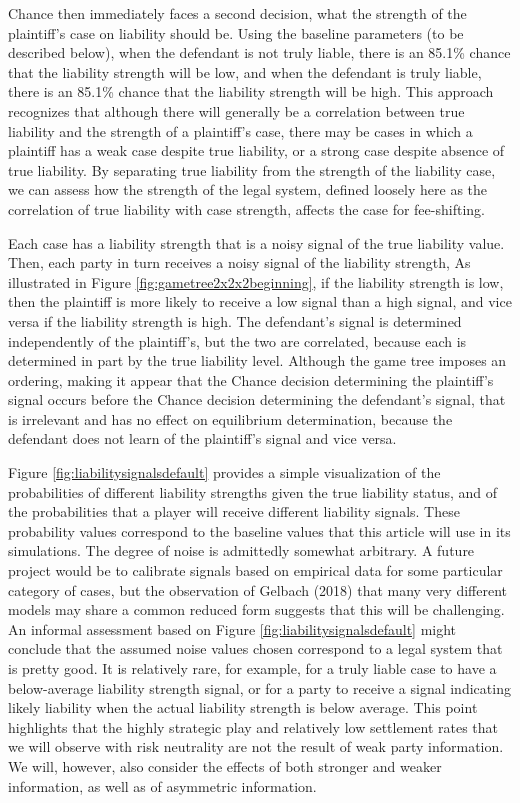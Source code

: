 \documentclass{article}
\begin{document}
Chance then immediately faces a second decision, what the strength of the plaintiff's case on liability should be. Using the baseline parameters (to be described below), when the defendant is not truly liable, there is an 85.1\% chance that the liability strength will be low, and when the defendant is truly liable, there is an 85.1\% chance that the liability strength will be high. This approach recognizes that although there will generally be a correlation between true liability and the strength of a plaintiff's case, there may be cases in which a plaintiff has a weak case despite true liability, or a strong case despite absence of true liability. By separating true liability from the strength of the liability case, we can assess how the strength of the legal system, defined loosely here as the correlation of true liability with case strength, affects the case for fee-shifting. 

Each case has a liability strength that is a noisy signal of the true liability value. Then, each party in turn receives a noisy signal of the liability strength,  As illustrated in Figure \ref{fig:gametree2x2x2beginning}, if the liability strength is low, then the plaintiff is more likely to receive a low signal than a high signal, and vice versa if the liability strength is high. The defendant's signal is determined independently of the plaintiff's, but the two are correlated, because each is determined in part by the true liability level. Although the game tree imposes an ordering, making it appear that the Chance decision determining the plaintiff's signal occurs before the Chance decision determining the defendant's signal, that is irrelevant and has no effect on equilibrium determination, because the defendant does not learn of the plaintiff's signal and vice versa.

Figure \ref{fig:liabilitysignalsdefault} provides a simple visualization of the probabilities of different liability strengths given the true liability status, and of the probabilities that a player will receive different liability signals. These probability values correspond to the baseline values that this article will use in its simulations. The degree of noise is admittedly somewhat arbitrary. A future project would be to calibrate signals based on empirical data for some particular category of cases, but the observation of Gelbach (2018) \cite{gelbach} that many very different models may share a common reduced form suggests that this will be challenging. An informal assessment based on Figure \ref{fig:liabilitysignalsdefault} might conclude that the assumed noise values chosen correspond to a legal system that is pretty good. It is relatively rare, for example, for a truly liable case to have a below-average liability strength signal, or for a party to receive a signal indicating likely liability when the actual liability strength is below average. This point highlights that the highly strategic play and relatively low settlement rates that we will observe with risk neutrality are not the result of weak party information. We will, however, also consider the effects of both stronger and weaker information, as well as of asymmetric information.
\end{document}
